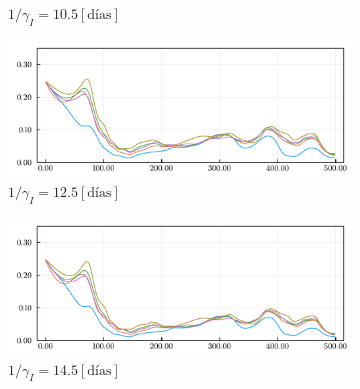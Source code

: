 \begin{figure}[H]
\begin{subfigure}[b]{.47\textwidth}
         \caption{\(1/\gamma_I = 10.5 [\text{días}]\)}
     \end{subfigure}
     \hfill
     \begin{subfigure}[b]{.47\textwidth}
         \centering
         \includegraphics[width=\textwidth]{img/resultados/sensigammai_12-5_0alphaini0-15_0-1_0-45_high1__acov0-8_aini0-27675_gcov0-05gamma_e_0-1724_gamma_i_0-1389_beta_2_2-0000.pdf}
         \caption{\(1/\gamma_I = 12.5 [\text{días}]\)}
     \end{subfigure}
     \hfill
     \begin{subfigure}[b]{.47\textwidth}
         \centering
         \includegraphics[width=\textwidth]{img/resultados/sensigammai_14-5_0alphaini0-15_0-1_0-45_high1__acov0-8_aini0-27675_gcov0-05gamma_e_0-1724_gamma_i_0-1389_beta_2_2-0000.pdf}
         \caption{\(1/\gamma_I = 14.5 [\text{días}]\)}
     \end{subfigure}
     \hfill
     \begin{subfigure}[b]{0.99\textwidth}
    \centering
    \scalebox{0.7}{
    
    }
    \end{subfigure}
    \caption[Sensibilidad factor sanitario estimado para los datos reales, ante distintos \(\gamma_I\).]{}
    \label{sensi-gammai-real}
\end{figure}



